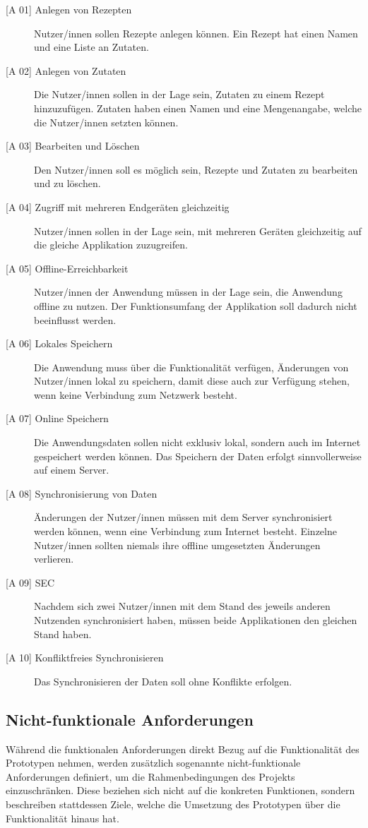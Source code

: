 \documentclass[a4paper, 12pt]{scrreprt}
\begin{document}
\begin{description}
	\item[{[A 01]} Anlegen von Rezepten]
	Nutzer/innen sollen Rezepte anlegen können. Ein Rezept hat einen Namen und eine Liste an Zutaten. 
	\item[{[A 02]} Anlegen von Zutaten]
	Die Nutzer/innen sollen in der Lage sein, Zutaten zu einem Rezept hinzuzufügen. Zutaten haben einen Namen und eine Mengenangabe, welche die Nutzer/innen setzten können.
	\item[{[A 03]} Bearbeiten und Löschen]
	Den Nutzer/innen soll es möglich sein, Rezepte und Zutaten zu bearbeiten und zu löschen. 
	\item[{[A 04]} Zugriff mit mehreren Endgeräten gleichzeitig]
	Nutzer/innen sollen in der Lage sein, mit mehreren Geräten gleichzeitig auf die gleiche Applikation zuzugreifen.
	\item[{[A 05]} Offline-Erreichbarkeit]
	Nutzer/innen der Anwendung müssen in der Lage sein, die Anwendung offline zu nutzen. Der Funktionsumfang der Applikation soll dadurch nicht beeinflusst werden. 
	\item[{[A 06]} Lokales Speichern]
	Die Anwendung muss über die Funktionalität verfügen, Änderungen von Nutzer/innen lokal zu speichern, damit diese auch zur Verfügung stehen, wenn keine Verbindung zum Netzwerk besteht.
	\item[{[A 07]} Online Speichern]
	Die Anwendungsdaten sollen nicht exklusiv lokal, sondern auch im Internet gespeichert werden können. Das Speichern der Daten erfolgt sinnvollerweise auf einem Server. 
	\item[{[A 08]} Synchronisierung von Daten]
	Änderungen der Nutzer/innen müssen mit dem Server synchronisiert werden können, wenn eine Verbindung zum Internet besteht. Einzelne Nutzer/innen sollten niemals ihre offline umgesetzten Änderungen verlieren.
	\item[{[A 09]} \ac{SEC}] Nachdem sich zwei Nutzer/innen mit dem Stand des jeweils anderen Nutzenden synchronisiert haben, müssen beide Applikationen den gleichen Stand haben.
	\item[{{[A 10]} Konfliktfreies Synchronisieren}] Das Synchronisieren der Daten soll ohne Konflikte erfolgen. 
\end{description}


\subsection{Nicht-funktionale Anforderungen}
Während die funktionalen Anforderungen direkt Bezug auf die Funktionalität des Prototypen nehmen, werden zusätzlich sogenannte nicht-funktionale Anforderungen definiert, um die Rahmenbedingungen des Projekts einzuschränken. Diese beziehen sich nicht auf die konkreten Funktionen, sondern beschreiben stattdessen Ziele, welche die Umsetzung des Prototypen über die Funktionalität hinaus hat. 
\end{document}
